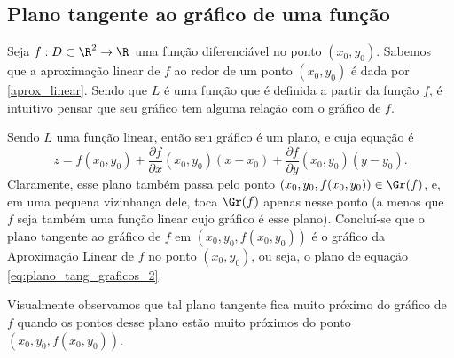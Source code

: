 \subsection{Plano tangente ao gráfico de uma função}

Seja $f:D\subset \R^2\to \R$ uma função diferenciável no ponto $(x_0,y_0)$. Sabemos que a aproximação linear de $f$ ao redor de um ponto $(x_0,y_0)$ é dada por \eqref{aprox_linear}. Sendo que $L$ é uma função que é definida a partir da função $f$, é intuitivo pensar que seu gráfico tem alguma relação com o gráfico de $f$. 

Sendo $L$ uma função linear, então seu gráfico é um plano, e cuja equação é 
\begin{equation}\label{eq:plano_tang_graficos_2}
z = f(x_0,y_0) + \dfrac{\partial f}{\partial x}(x_0,y_0) (x-x_0) + \dfrac{\partial f}{\partial y}(x_0,y_0) (y- y_0) . 
\end{equation}
Claramente, esse plano também passa pelo ponto $(x_0,y_0,f(x_0,y_0))\in \Gr(f)$, e, em uma pequena vizinhança dele, toca $\Gr(f)$ apenas nesse ponto (a menos que $f$ seja também uma função linear cujo gráfico é esse plano). Concluí-se que o plano tangente ao gráfico de $f$ em $(x_0,y_0,f(x_0,y_0))$ é o gráfico da Aproximação Linear de $f$ no ponto $(x_0,y_0)$, ou seja, o plano de equação \eqref{eq:plano_tang_graficos_2}.

Visualmente observamos que tal plano tangente fica muito próximo do gráfico de $f$ quando os pontos desse plano estão muito próximos do ponto $(x_0,y_0,f(x_0,y_0))$. 






